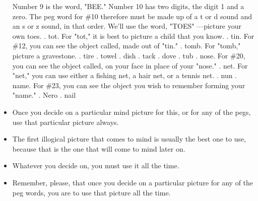\begin{itemize}
                \subitem Number 9 is the word, "BEE."
                \subitem Number 10 has two digits, the digit 1 and a zero. The peg word
            for \#10 therefore must be made up of a t or d sound and
            an s or z sound, in that order. We'll use the word, "TOES"
            —picture your own toes.
                . tot. For "tot," it is best to picture a child that you know.
                . tin. For \#12, you can see the object called, made out of "tin."
                . tomb. For "tomb," picture a gravestone.
                . tire
                . towel
                . dish
                . tack
                . dove
                . tub
                . nose. For \#20, you can see
            the object called, on your face in place of your "nose."
                . net. For
            "net," you can use either a fishing net, a hair net, or a
            tennis net.
                . nun
                . name. For \#23, you can see the object you wish to remember
            forming your "name."
                . Nero
                . nail
            \item Once you decide on a particular mind picture for
            this, or for any of the pegs, use that particular picture
            always.
            \item The first illogical picture that
            comes to mind is usually the best one to use, because that is the
            one that will come to mind later on.
            \item Whatever you
            decide on, you must use it all the time.
            \item Remember, please, that once you decide on a particular
            picture for any of the peg words, you are to use that picture
            all the time.
        \end{itemize}

